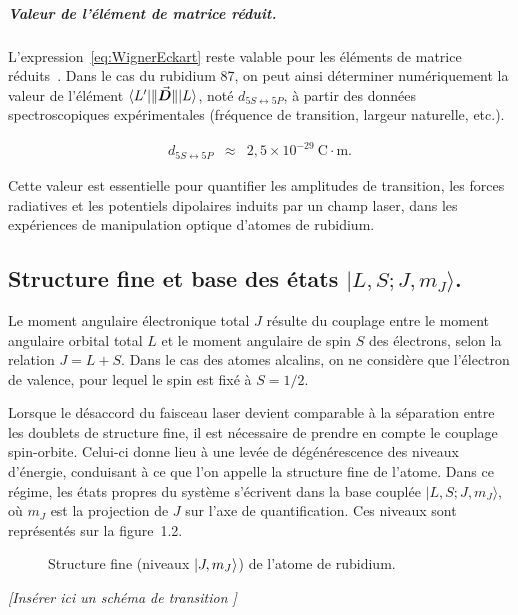 \subparagraph{Valeur de l’élément de matrice réduit.}

L'expression~\eqref{eq:WignerEckart} reste valable pour les éléments de matrice réduits~\cite{CCT_QO}. Dans le cas du rubidium 87, on peut ainsi déterminer numériquement la valeur de l’élément $\bra{L'}\!\|\vec{{\bm{D}}}\|\!\ket{L}$, noté $d_{\scriptstyle 5S \leftrightarrow 5P}$, à partir des données spectroscopiques expérimentales (fréquence de transition, largeur naturelle, etc.).

\begin{eqnarray}
d_{\scriptstyle 5S \leftrightarrow 5P} &\approx& 2{,}5 \times 10^{-29}~\mathrm{C \cdot m}.
\end{eqnarray}

Cette valeur est essentielle pour quantifier les amplitudes de transition, les forces radiatives et les potentiels dipolaires induits par un champ laser, dans les expériences de manipulation optique d’atomes de rubidium.



\subsection{Structure fine et base des états $|L, S; J, m_J\rangle$.}

Le moment angulaire électronique total $J$ résulte du couplage entre le moment angulaire orbital total $L$ et le moment angulaire de spin $S$ des électrons, selon la relation $J = L + S$. Dans le cas des atomes alcalins, on ne considère que l’électron de valence, pour lequel le spin est fixé à $S = 1/2$.

Lorsque le désaccord du faisceau laser devient comparable à la séparation entre les doublets de structure fine, il est nécessaire de prendre en compte le couplage spin-orbite. Celui-ci donne lieu à une levée de dégénérescence des niveaux d’énergie, conduisant à ce que l’on appelle la structure fine de l’atome. Dans ce régime, les états propres du système s’écrivent dans la base couplée $|L, S; J, m_J\rangle$, où $m_J$ est la projection de $J$ sur l’axe de quantification. Ces niveaux sont représentés sur la figure~1.2.


\begin{figure}[!htb]
	\centering
\caption{Structure fine (niveaux $\ket{J, m_J}$) de l’atome de rubidium.}

\end{figure}
\vspace{1em}
\begin{center}
\textit{[Insérer ici un schéma de transition ]}
\end{center}

